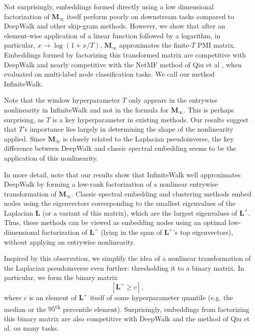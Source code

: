 \documentclass[sigconf]{acmart}
\newcommand{\mbf}[1]{\mathbf{#1}}
\newcommand{\bv}[1]{\mathbf{#1}}
\begin{document}
Not surprisingly, embeddings formed directly using a low dimensional factorization of $\bv{M_\infty}$ itself perform poorly on downstream tasks compared to DeepWalk and other skip-gram methods. However, we show that after an element-wise application of a linear function followed by a logarithm, in particular, $x \to \log(1+x/T)$, $\bv{M_\infty}$ approximates the finite-$T$ PMI matrix. Embeddings formed by factorizing this transformed matrix are competitive with DeepWalk and nearly competitive with the NetMF method of Qiu et al \cite{qiu2018network}, when evaluated on multi-label node classification tasks. We call our method InfiniteWalk.

Note that the window hyperparameter $T$ only appears in the entrywise nonlinearity in InfiniteWalk and not in the formula for $\bv{M_\infty}$. %
This is perhaps surprising, as $T$ is a key hyperparameter in existing methods. Our results suggest that $T$'s importance lies largely in determining the shape of the nonlinearity applied. Since $\bv{M_\infty}$ is closely related to the Laplacian pseudoinverse, the key difference between DeepWalk and classic spectral embedding seems to be the application of this nonlinearity. 

In more detail, note that our results show that InfiniteWalk well approximates DeepWalk by forming a low-rank factorization of a nonlinear entrywise transformation of $\bv{M_\infty}$. Classic spectral embedding and clustering methods \cite{shi2000normalized,mcsherry2001spectral,belkin2003laplacian} embed nodes using the eigenvectors corresponding to the smallest eigenvalues of the Laplacian $\bv{L}$ (or a variant of this matrix), which are the largest eigenvalues of $\bv{L}^+$. Thus, these methods can be viewed as  embedding nodes using an optimal low-dimensional factorization of $\bv{L}^+$ (lying in the span of $\bv{L}^+$'s top eigenvectors), without applying an entrywise nonlinearity. 

Inspired by this observation, we simplify the idea of a nonlinear transformation of the Laplacian pseudoinverse even further: thresholding it to a binary matrix. In particular, we form the binary matrix
%
\[ [\mbf{L}^+ \geq c] ,\]
%
where $c$ is an element of $\mbf{L}^+$ itself of some hyperparameter quantile (e.g. the median or the $95$\textsuperscript{th} percentile element). Surprisingly, embeddings from factorizing this binary matrix are also competitive with DeepWalk and the method of Qiu et al. on many tasks.
\end{document}
